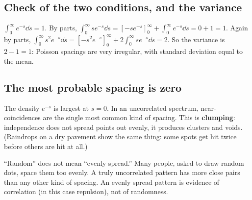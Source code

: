 \subsection{Check of the two conditions, and the variance}

$\int_0^\infty e^{-s}\dd s=1$. By parts, $\int_0^\infty s e^{-s}\dd s=\left[-se^{-s}\right]_0^\infty+\int_0^\infty e^{-s}\dd s=0+1=1$. Again by parts, $\int_0^\infty s^2e^{-s}\dd s=\left[-s^2e^{-s}\right]_0^\infty+2\int_0^\infty se^{-s}\dd s=2$. So the variance is $2-1=1$: Poisson spacings are very irregular, with standard deviation equal to the mean.

\subsection{The most probable spacing is zero}

The density $e^{-s}$ is largest at $s=0$. In an uncorrelated spectrum, near-coincidences are the single most common kind of spacing. This is \textbf{clumping}: independence does not spread points out evenly, it produces clusters and voids. (Raindrops on a dry pavement show the same thing: some spots get hit twice before others are hit at all.)

\begin{pitfall}
``Random'' does not mean ``evenly spread.'' Many people, asked to draw random dots, space them too evenly. A truly uncorrelated pattern has more close pairs than any other kind of spacing. An evenly spread pattern is evidence of correlation (in this case repulsion), not of randomness.
\end{pitfall}

